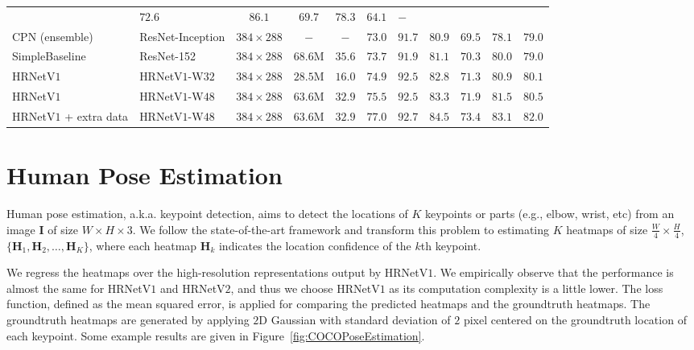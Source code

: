 \documentclass[10pt,journal,compsoc]{IEEEtran}
\begin{document}
\begin{table}[t]
\begin{tabular}{l|l|c|c|c|lllllc}
				& $72.6$ & $86.1$&$69.7$&$78.3$&$64.1$&$-$\\
				CPN (ensemble)~\cite{ChenWPZYS17} & ResNet-Inception& $384\times288$ &$-$& $-$
				&$73.0$ & $91.7$&$80.9$&$69.5$&$78.1$&$ 79.0$\\
				SimpleBaseline~\cite{XiaoWW18} & ResNet-152&$384\times288$  &$68.6$M& $35.6$
				&${73.7}$ & ${91.9}$&${81.1}$&${70.3}$&${80.0}$&${79.0}$\\
				\hline
				HRNetV$1$ & HRNetV$1$-W$32$& $384\times 288$ &$28.5$M&$16.0$ &$74.9$&$92.5$&$82.8$&$71.3$&$80.9$&$80.1$\\
				HRNetV$1$ & HRNetV$1$-W$48$& $384\times 288$ &$63.6$M& $32.9$
				& ${75.5}$&${92.5}$&${83.3}$&${71.9}$&${81.5}$&${80.5}$\\
				\hline
				HRNetV$1$ + extra data & HRNetV$1$-W$48$& $384\times 288$ &$63.6$M& $32.9$
				& $\mathbf{77.0}$&$\mathbf{92.7}$&$\mathbf{84.5}$&$\mathbf{73.4}$&$\mathbf{83.1}$&$\mathbf{82.0}$\\
				\hline
			\end{tabular}
			\vspace{-1mm}
	\end{table}
	
\section{Human Pose Estimation}
\label{sec:poseexperiments}

Human pose estimation, a.k.a. keypoint detection,
aims to detect the locations of $K$ keypoints or parts
(e.g., elbow, wrist, etc) from an image $\mathbf{I}$
of size $W \times H \times 3$.
We follow the state-of-the-art framework
and transform this problem
to estimating $K$ heatmaps of size $\frac{W}{4} \times \frac{H}{4}$,
$\{\mathbf{H}_1, \mathbf{H}_2, \dots, \mathbf{H}_K\}$, 
where each heatmap $\mathbf{H}_k$ indicates 
the location confidence of the $k$th keypoint.

We regress the heatmaps
over the high-resolution representations
output by HRNetV$1$.
We empirically observe
that the performance is almost the same
for HRNetV$1$
and HRNetV$2$,
and thus we choose HRNetV$1$
as its computation complexity is a little lower.
The loss function, defined as 
the mean squared error,
is applied for comparing
the predicted heatmaps
and the groundtruth heatmaps.
The groundtruth heatmaps are generated 
by applying $2$D Gaussian 
with standard deviation of $2$ pixel
centered on the groundtruth location
of each keypoint. 
Some example results are given
in Figure~\ref{fig:COCOPoseEstimation}.
\end{document}
